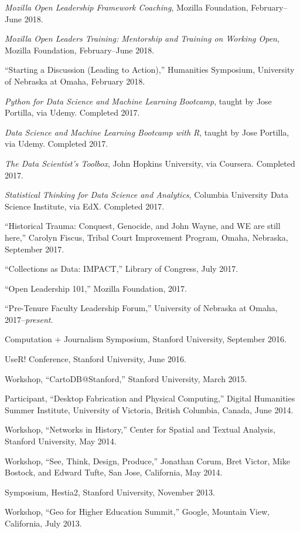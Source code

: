 \emph{Mozilla Open Leadership Framework Coaching}, Mozilla Foundation,
February--June 2018.

\emph{Mozilla Open Leaders Training: Mentorship and Training on Working
Open}, Mozilla Foundation, February--June 2018.

``Starting a Discussion (Leading to Action),'' Humanities Symposium,
University of Nebraska at Omaha, February 2018.

\emph{Python for Data Science and Machine Learning Bootcamp}, taught by
Jose Portilla, via Udemy. Completed 2017.

\emph{Data Science and Machine Learning Bootcamp with R}, taught by Jose
Portilla, via Udemy. Completed 2017.

\emph{The Data Scientist's Toolbox}, John Hopkins University, via
Coursera. Completed 2017.

\emph{Statistical Thinking for Data Science and Analytics}, Columbia
University Data Science Institute, via EdX. Completed 2017.

``Historical Trauma: Conquest, Genocide, and John Wayne, and WE are
still here,'' Carolyn Fiscus, Tribal Court Improvement Program, Omaha,
Nebraska, September 2017.

``Collections as Data: IMPACT,'' Library of Congress, July 2017.

``Open Leadership 101,'' Mozilla Foundation, 2017.

``Pre-Tenure Faculty Leadership Forum,'' University of Nebraska at
Omaha, 2017--\emph{present}.

Computation + Journalism Symposium, Stanford University, September 2016.

UseR! Conference, Stanford University, June 2016.

Workshop, ``CartoDB@Stanford,'' Stanford University, March 2015.

Participant, ``Desktop Fabrication and Physical Computing,'' Digital
Humanities Summer Institute, University of Victoria, British Columbia,
Canada, June 2014.

Workshop, ``Networks in History,'' Center for Spatial and Textual
Analysis, Stanford University, May 2014.

Workshop, ``See, Think, Design, Produce,'' Jonathan Corum, Bret Victor,
Mike Bostock, and Edward Tufte, San Jose, California, May 2014.

Symposium, Hestia2, Stanford University, November 2013.

Workshop, ``Geo for Higher Education Summit,'' Google, Mountain View,
California, July 2013.

